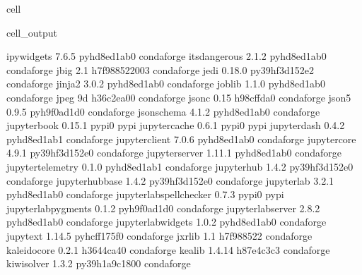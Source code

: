 \documentclass[letterpaper,table,10pt,english]{jupyterBook}
\begin{document}
\begin{sphinxuseclass}{cell}
\begin{sphinxVerbatimOutput}
\begin{sphinxuseclass}{cell_output}
\begin{sphinxVerbatim}[commandchars=\\\{\}]
ipywidgets                7.6.5              pyhd8ed1ab\PYGZus{}0    conda\PYGZhy{}forge
itsdangerous              2.1.2              pyhd8ed1ab\PYGZus{}0    conda\PYGZhy{}forge
jbig                      2.1               h7f98852\PYGZus{}2003    conda\PYGZhy{}forge
jedi                      0.18.0           py39hf3d152e\PYGZus{}2    conda\PYGZhy{}forge
jinja2                    3.0.2              pyhd8ed1ab\PYGZus{}0    conda\PYGZhy{}forge
joblib                    1.1.0              pyhd8ed1ab\PYGZus{}0    conda\PYGZhy{}forge
jpeg                      9d                   h36c2ea0\PYGZus{}0    conda\PYGZhy{}forge
json\PYGZhy{}c                    0.15                 h98cffda\PYGZus{}0    conda\PYGZhy{}forge
json5                     0.9.5              pyh9f0ad1d\PYGZus{}0    conda\PYGZhy{}forge
jsonschema                4.1.2              pyhd8ed1ab\PYGZus{}0    conda\PYGZhy{}forge
jupyter\PYGZhy{}book              0.15.1                   pypi\PYGZus{}0    pypi
jupyter\PYGZhy{}cache             0.6.1                    pypi\PYGZus{}0    pypi
jupyter\PYGZhy{}dash              0.4.2              pyhd8ed1ab\PYGZus{}1    conda\PYGZhy{}forge
jupyter\PYGZus{}client            7.0.6              pyhd8ed1ab\PYGZus{}0    conda\PYGZhy{}forge
jupyter\PYGZus{}core              4.9.1            py39hf3d152e\PYGZus{}0    conda\PYGZhy{}forge
jupyter\PYGZus{}server            1.11.1             pyhd8ed1ab\PYGZus{}0    conda\PYGZhy{}forge
jupyter\PYGZus{}telemetry         0.1.0              pyhd8ed1ab\PYGZus{}1    conda\PYGZhy{}forge
jupyterhub                1.4.2            py39hf3d152e\PYGZus{}0    conda\PYGZhy{}forge
jupyterhub\PYGZhy{}base           1.4.2            py39hf3d152e\PYGZus{}0    conda\PYGZhy{}forge
jupyterlab                3.2.1              pyhd8ed1ab\PYGZus{}0    conda\PYGZhy{}forge
jupyterlab\PYGZhy{}spellchecker   0.7.3                    pypi\PYGZus{}0    pypi
jupyterlab\PYGZus{}pygments       0.1.2              pyh9f0ad1d\PYGZus{}0    conda\PYGZhy{}forge
jupyterlab\PYGZus{}server         2.8.2              pyhd8ed1ab\PYGZus{}0    conda\PYGZhy{}forge
jupyterlab\PYGZus{}widgets        1.0.2              pyhd8ed1ab\PYGZus{}0    conda\PYGZhy{}forge
jupytext                  1.14.5             pyhcff175f\PYGZus{}0    conda\PYGZhy{}forge
jxrlib                    1.1                  h7f98852\PYGZus{}2    conda\PYGZhy{}forge
kaleido\PYGZhy{}core              0.2.1                h3644ca4\PYGZus{}0    conda\PYGZhy{}forge
kealib                    1.4.14               h87e4c3c\PYGZus{}3    conda\PYGZhy{}forge
kiwisolver                1.3.2            py39h1a9c180\PYGZus{}0    conda\PYGZhy{}forge

\end{sphinxVerbatim}
\end{sphinxuseclass}
\end{sphinxVerbatimOutput}
\end{sphinxuseclass}
\end{document}
